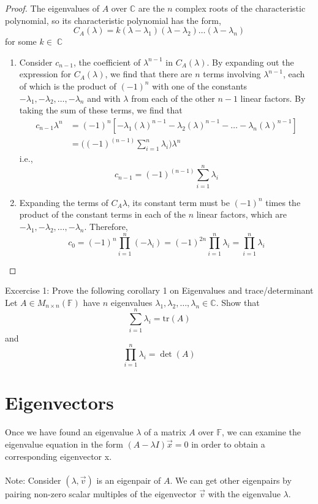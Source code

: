 \documentclass[11pt, a4paper]{memoir}
\DeclareMathOperator{\C}{{\mathbb{C}}}
\theoremstyle{change}
\theoremstyle{plain}
\theoremstyle{nonumberplain}
\newtheorem{proof}{Proof}
\numberwithin{equation}{section}
\begin{document}
\begin{proof}
  The eigenvalues of $A$ over $\mathbb{C}$ are the $n$ complex roots of the characteristic polynomial, so its characteristic polynomial has the form, $$C_A(\lambda) = k(\lambda - \lambda_1)(\lambda - \lambda_2) \dots (\lambda - \lambda_n)$$
  for some $k \in \C$
  \begin{enumerate}
    \item Consider $c_{n-1}$, the coefficient of $\lambda^{n-1}$ in $C_A(\lambda)$. By expanding out the expression for $C_A(\lambda)$, we find that there are $n$ terms involving $\lambda^{n-1}$, each of which is the product of $(-1)^n$ with one of the constants $-\lambda_1, -\lambda_2, \dots, -\lambda_n$ and with $\lambda$ from each of the other $n-1$ linear factors. By taking the sum of these terms, we find that 
          \begin{align*}
              c_{n-1}\lambda^n &= (-1)^n [-\lambda_1(\lambda)^{n-1} -\lambda_2(\lambda)^{n-1} - \dots - \lambda_n(\lambda)^{n-1}]\\
                      &= \Bigg((-1)^{(n-1)} \sum^{n}_{i=1} \lambda_i\Bigg)\lambda^n
          \end{align*}
          i.e., $$c_{n-1} = (-1)^{(n-1)}\sum^{n}_{i=1}\lambda_i$$
    \item Expanding the terms of $C_A{\lambda}$, its constant term must be $(-1)^n$ times the product of the constant terms in each of the $n$ linear factors, which are $-\lambda_1, -\lambda_2, \dots, -\lambda_n$. Therefore, 
          $$c_0 = (-1)^n \prod^n_{i=1}(-\lambda_i) = (-1)^{2n}\prod^n_{i=1}\lambda_i = \prod^n_{i=1}\lambda_i$$
  \end{enumerate}
\end{proof}
Excercise 1: Prove the following corollary 1 on Eigenvalues and trace/determinant\\
Let $A \in M_{n \times n}(\mathbb{F})$  have $n$ eigenvalues $\lambda_1, \lambda_2, \dots, \lambda_n \in \mathbb{C}$. Show that 
$$\sum^n_{i=1}\lambda_i = \text{tr}(A)$$ and $$\prod^n_{i=1}\lambda_i = \det(A)$$

\section{Eigenvectors}
Once we have found an eigenvalue $\lambda$ of a matrix $A$ over $\mathbb{F}$, we can examine the eigenvalue equation in the form $(A - \lambda I)\vec{x} = 0$  in order to obtain a corresponding eigenvector x.
\\ \; \\
Note: Consider $(\lambda, \vec{v})$ is an eigenpair of $A$. We can get other eigenpairs by pairing non-zero scalar multiples of the eigenvector $\vec{v}$ with the eigenvalue $\lambda$.
\end{document}
